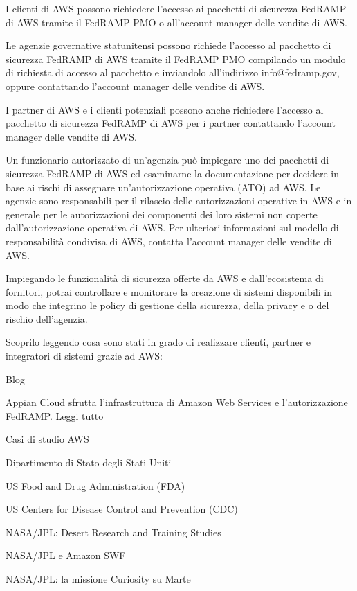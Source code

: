 \documentclass[../main.tex]{subfiles}
\begin{document}
I clienti di AWS possono richiedere l'accesso ai pacchetti di sicurezza FedRAMP di AWS tramite il FedRAMP PMO o all'account manager delle vendite di AWS.

Le agenzie governative statunitensi possono richiede l'accesso al pacchetto di sicurezza FedRAMP di AWS tramite il FedRAMP PMO compilando un modulo di richiesta di accesso al pacchetto e inviandolo all'indirizzo info@fedramp.gov, oppure contattando l'account manager delle vendite di AWS.

I partner di AWS e i clienti potenziali possono anche richiedere l'accesso al pacchetto di sicurezza FedRAMP di AWS per i partner contattando l'account manager delle vendite di AWS.

Un funzionario autorizzato di un'agenzia può impiegare uno dei pacchetti di sicurezza FedRAMP di AWS ed esaminarne la documentazione per decidere in base ai rischi di assegnare un'autorizzazione operativa (ATO) ad AWS. Le agenzie sono responsabili per il rilascio delle autorizzazioni operative in AWS e in generale per le autorizzazioni dei componenti dei loro sistemi non coperte dall'autorizzazione operativa di AWS. Per ulteriori informazioni sul modello di responsabilità condivisa di AWS, contatta l'account manager delle vendite di AWS.

Impiegando le funzionalità di sicurezza offerte da AWS e dall'ecosistema di fornitori, potrai controllare e monitorare la creazione di sistemi disponibili in modo che integrino le policy di gestione della sicurezza, della privacy e o del rischio dell'agenzia.

Scoprilo leggendo cosa sono stati in grado di realizzare clienti, partner e integratori di sistemi grazie ad AWS:

Blog

Appian Cloud sfrutta l'infrastruttura di Amazon Web Services e l'autorizzazione FedRAMP. Leggi tutto

Casi di studio AWS

Dipartimento di Stato degli Stati Uniti

US Food and Drug Administration (FDA)

US Centers for Disease Control and Prevention (CDC)

NASA/JPL: Desert Research and Training Studies

NASA/JPL e Amazon SWF

NASA/JPL: la missione Curiosity su Marte
\end{document}
